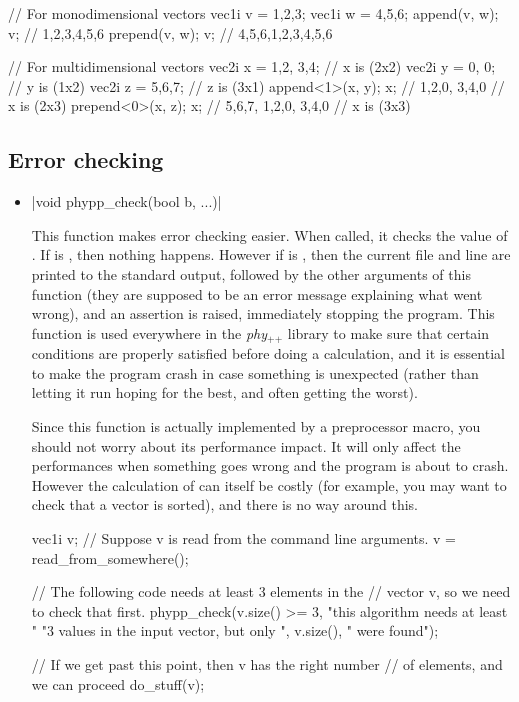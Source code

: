 \documentclass[12pt]{report}
\newcommand{\phypp}{\textit{phy}$_{\text{++}}$\xspace}
\newenvironment{example}
{
    \begin{mdframed}[style=example,frametitle={Example}]
}
{
    \end{mdframed}
}
\begin{document}
\begin{itemize}
\begin{example}
\begin{cppcode}
// For monodimensional vectors
vec1i v = {1,2,3};
vec1i w = {4,5,6};
append(v, w);
v; // {1,2,3,4,5,6}
prepend(v, w);
v; // {4,5,6,1,2,3,4,5,6}

// For multidimensional vectors
vec2i x = {{1,2}, {3,4}};         // x is (2x2)
vec2i y = {{0}, {0}};             // y is (1x2)
vec2i z = {{5,6,7}};              // z is (3x1)
append<1>(x, y);
x; // {{1,2,0}, {3,4,0}}          // x is (2x3)
prepend<0>(x, z);
x; // {{5,6,7}, {1,2,0}, {3,4,0}} // x is (3x3)
\end{cppcode}
\end{example}
\end{itemize}

\subsection{Error checking}

\begin{itemize}
\item \cppinline|void phypp_check(bool b, ...)| 

This function makes error checking easier. When called, it checks the value of . If  is , then nothing happens. However if  is , then the current file and line are printed to the standard output, followed by the other arguments of this function (they are supposed to be an error message explaining what went wrong), and an assertion is raised, immediately stopping the program. This function is used everywhere in the \phypp library to make sure that certain conditions are properly satisfied before doing a calculation, and it is essential to make the program crash in case something is unexpected (rather than letting it run hoping for the best, and often getting the worst).

Since this function is actually implemented by a preprocessor macro, you should not worry about its performance impact. It will only affect the performances when something goes wrong and the program is about to crash. However the calculation of  can itself be costly (for example, you may want to check that a vector is sorted), and there is no way around this.

\begin{example}
\begin{cppcode}
vec1i v;
// Suppose v is read from the command line arguments.
v = read_from_somewhere();

// The following code needs at least 3 elements in the
// vector v, so we need to check that first.
phypp_check(v.size() >= 3, "this algorithm needs at least "
    "3 values in the input vector, but only ", v.size(),
    " were found");

// If we get past this point, then v has the right number
// of elements, and we can proceed
do_stuff(v);
\end{cppcode}
\end{example}
\end{itemize}
\end{document}

